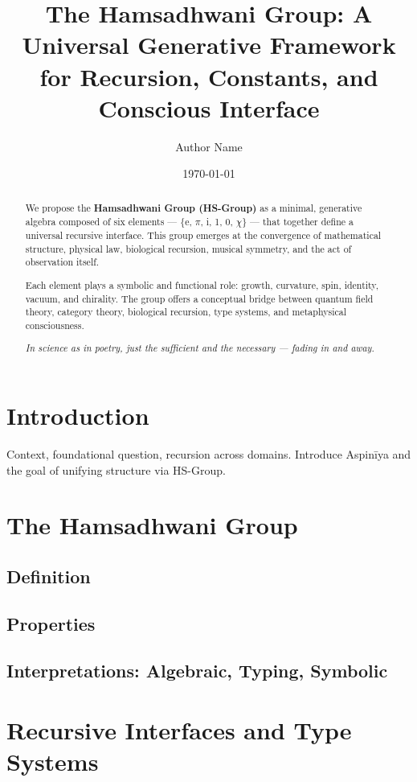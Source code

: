 \documentclass[12pt]{article}
\title{The Hamsadhwani Group: A Universal Generative Framework for Recursion, Constants, and Conscious Interface}
\author{Author Name}
\date{\today}
\begin{document}
\maketitle

\begin{abstract}
We propose the \textbf{Hamsadhwani Group (HS-Group)} as a minimal, generative algebra composed of six elements --- \{e, $\pi$, i, 1, 0, $\chi$\} --- that together define a universal recursive interface. This group emerges at the convergence of mathematical structure, physical law, biological recursion, musical symmetry, and the act of observation itself.

Each element plays a symbolic and functional role: growth, curvature, spin, identity, vacuum, and chirality. The group offers a conceptual bridge between quantum field theory, category theory, biological recursion, type systems, and metaphysical consciousness.

\textit{In science as in poetry, just the sufficient and the necessary --- fading in and away.}
\end{abstract}

\tableofcontents
\newpage

\section{Introduction}
Context, foundational question, recursion across domains. Introduce Aspinīya and the goal of unifying structure via HS-Group.

\section{The Hamsadhwani Group}
\subsection{Definition}
\subsection{Properties}
\subsection{Interpretations: Algebraic, Typing, Symbolic}

\section{Recursive Interfaces and Type Systems}
\end{document}
